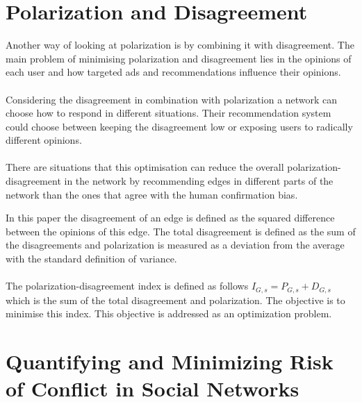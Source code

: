 \section{Polarization and Disagreement}
\label{sec:polarizationDisareement}

Another way of looking at polarization is by combining it with disagreement. The main problem of minimising polarization and disagreement lies in the opinions of each user and how targeted ads and recommendations influence their opinions. 
\\
\\
Considering the disagreement in combination with polarization a network can choose how to respond in different situations. Their recommendation system could choose between keeping the disagreement low or exposing users to radically different opinions. 
\\
\\
There are situations that this optimisation can reduce the overall polarization-disagreement in the network by recommending edges in different parts of the network than the ones that agree with the human confirmation bias. 

\clearpage

\noindent In this paper the disagreement of an edge is defined as the squared difference between the opinions of this edge. The total disagreement is defined as the sum of the disagreements and 
polarization is measured as a deviation from the average with the standard definition of variance.
\\
\\
The polarization-disagreement index is defined as follows $I_{G,s} = P_{G,s} +D_{G,s}$ which is the sum of the total disagreement and polarization. The objective is to minimise this index. This objective is addressed as an optimization problem.
\cite{musco}


\section{Quantifying and Minimizing Risk of Conflict in Social Networks}
\label{sec:riskOfConflict}

